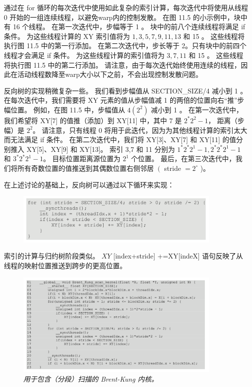 通过在 for 循环的每次迭代中使用如此复杂的索引计算，每次迭代中将使用从线程 0 开始的一组连续线程，以避免warp内的控制发散。 
在图 11.5 的小示例中，块中有 16 个线程。 在第一次迭代中，步幅等于 1 。 块中的前八个连续线程将满足 if 条件。 
为这些线程计算的 XY 索引值将为 $1,3,5,7,9,11,13$ 和 15 。 这些线程将执行图 11.5 中的第一行添加。 
在第二次迭代中，步长等于 2。只有块中的前四个线程才会满足 if 条件。 为这些线程计算的索引值将为 $3,7,11$ 和 15 。 
这些线程将执行图 11.5 中的第二行添加。 
请注意，由于每次迭代始终使用连续的线程，因此在活动线程数降至warp大小以下之前，不会出现控制发散问题。

反向树的实现稍微复杂一些。 我们看到步幅值从 SECTION\_SIZE/4 减小到 1 。 
在每次迭代中，我们需要将 XY 元素的值从步幅值减 1 的两倍的位置向右“推”步幅位置。 
例如，在图 11.5 中，步幅值从 $4\left(2^{2}\right)$ 减小到 1 。 
在第一次迭代中，我们希望将 XY[7] 的值推（添加）到 XY[11] 中，其中 7 是 $2^{*} 2^{2}-1$，
距离（步幅）是 $2^{ 2}$。 请注意，只有线程 0 将用于此迭代，因为为其他线程计算的索引太大而无法满足 if 条件。 
在第二次迭代中，我们将 XY[3]、XY[7] 和 XY[11] 的值分别推入 XY[5]、XY[9] 和 XY[13]。 
索引 3,7 和 11 分别为 $1^{*} 2^{*} 2^{1}-1,2^{*} 2^{*} 2^{1}-1$ 和 $3^{*} 2^{*} 2^{1}-1$。 
目标位置距离源位置为 $2^{1}$ 个位置。 
最后，在第三次迭代中，我们将所有奇数位置的值推送到其偶数位置右侧邻居 $\left(\right.$ stride $=2^{\circ}$ )。

在上述讨论的基础上，反向树可以通过以下循环来实现：

\begin{figure}[H]
	\centering
	\includegraphics[width=0.9\textwidth]{figs/F11-a4.png}
\end{figure}

索引的计算与归约树阶段类似。 $X Y$ [index+stride] +=XY[indeX] 语句反映了从线程的映射位置推送到跨步的更高位置。

\begin{figure}[H]
	\centering
	\includegraphics[width=0.9\textwidth]{figs/F11.7.png}
	\caption{\textit{用于包含（分段）扫描的 Brent-Kung 内核。}}
\end{figure}

